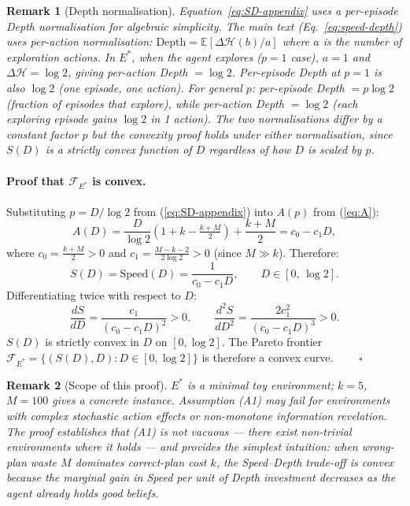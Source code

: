 \documentclass[11pt]{article}
\newtheorem{remark}{Remark}
\begin{document}
\begin{remark}[Depth normalisation]
\label{rem:depth-norm}
Equation~\ref{eq:SD-appendix} uses a \emph{per-episode} Depth normalisation for algebraic simplicity. The main text (Eq.~\ref{eq:speed-depth}) uses \emph{per-action} normalisation: $\text{Depth} = \mathbb{E}[\Delta\mathcal{H}(b)/a]$ where $a$ is the number of exploration actions. In $E^*$, when the agent explores ($p=1$ case), $a=1$ and $\Delta\mathcal{H} = \log 2$, giving per-action Depth $= \log 2$. Per-episode Depth at $p=1$ is also $\log 2$ (one episode, one action). For general $p$: per-episode Depth $= p\log 2$ (fraction of episodes that explore), while per-action Depth $= \log 2$ (each exploring episode gains $\log 2$ in 1 action). The two normalisations differ by a constant factor $p$ but the convexity proof holds under either normalisation, since $S(D)$ is a strictly convex function of $D$ regardless of how $D$ is scaled by $p$.
\end{remark}

\paragraph{Proof that $\mathcal{F}_{E^*}$ is convex.} Substituting $p = D/\log 2$ from (\ref{eq:SD-appendix}) into $A(p)$ from (\ref{eq:A}):
\begin{equation}
A(D) = \frac{D}{\log 2}\!\left(1+k - \tfrac{k+M}{2}\right) + \frac{k+M}{2}
     = c_0 - c_1 D,
\end{equation}
where $c_0 = \tfrac{k+M}{2} > 0$ and $c_1 = \tfrac{M-k-2}{2\log 2} > 0$ (since $M \gg k$). Therefore:
\begin{equation}
S(D) = \mathrm{Speed}(D) = \frac{1}{c_0 - c_1 D}, \qquad D \in \left[0,\, \log 2\right].
\end{equation}
Differentiating twice with respect to $D$:
\begin{equation}
\frac{dS}{dD} = \frac{c_1}{(c_0 - c_1 D)^2} > 0,
\qquad
\frac{d^2 S}{dD^2} = \frac{2c_1^2}{(c_0 - c_1 D)^3} > 0.
\end{equation}
$S(D)$ is strictly convex in $D$ on $[0, \log 2]$. The Pareto frontier $\mathcal{F}_{E^*} = \{(S(D), D) : D \in [0, \log 2]\}$ is therefore a convex curve. $\qquad\square$

\begin{remark}[Scope of this proof]
$E^*$ is a minimal toy environment; $k{=}5$, $M{=}100$ gives a concrete instance. Assumption (A1) may fail for environments with complex stochastic action effects or non-monotone information revelation. The proof establishes that (A1) is not vacuous --- there exist non-trivial environments where it holds --- and provides the simplest intuition: when wrong-plan waste $M$ dominates correct-plan cost $k$, the Speed--Depth trade-off is convex because the marginal gain in Speed per unit of Depth investment decreases as the agent already holds good beliefs.
\end{remark}
\end{document}
